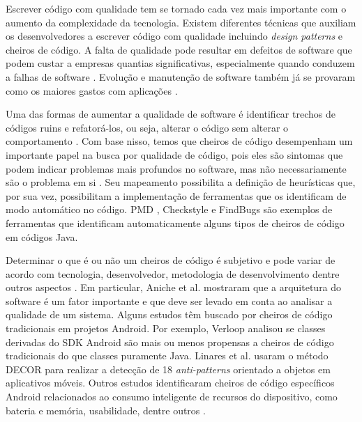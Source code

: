 Escrever código com qualidade tem se tornado cada vez mais importante com o aumento da complexidade da tecnologia. Existem diferentes técnicas que auxiliam os desenvolvedores a escrever código com qualidade incluindo \textit{design patterns} e cheiros de código. A falta de qualidade pode resultar em defeitos de software que podem custar a empresas quantias significativas, especialmente quando conduzem a falhas de software \cite{Nagappan:2005, briand1993modeling}. Evolução e manutenção de software também já se provaram como os maiores gastos com aplicações \cite{RefactoringAndImprovements:10}.

Uma das formas de aumentar a qualidade de software é identificar trechos de códigos ruins e refatorá-los, ou seja, alterar o código sem alterar o comportamento \cite{Refactoring:99}. Com base nisso, temos que cheiros de código desempenham um importante papel na busca por qualidade de código, pois eles são sintomas que podem indicar problemas mais profundos no software, mas não necessariamente são o problema em si \cite{CodeSmell:06}. Seu mapeamento possibilita a definição de heurísticas que, por sua vez, possibilitam a implementação de ferramentas que os identificam de modo automático no código. PMD \cite{PMD2016}, Checkstyle e FindBugs são exemplos de ferramentas que identificam automaticamente alguns tipos de cheiros de código em códigos Java.

Determinar o que é ou não um cheiros de código é subjetivo e pode variar de acordo com tecnologia, desenvolvedor, metodologia de desenvolvimento dentre outros aspectos \cite{WikiCodeSmell}. Em particular, Aniche et al. \cite{MvcSmells:16,aniche2016satt} mostraram que a arquitetura do software é um fator importante e que deve ser levado em conta ao analisar a qualidade de um sistema.   Alguns estudos têm buscado por cheiros de código tradicionais em projetos Android. Por exemplo, Verloop \cite{MobileSmells:13} analisou se classes derivadas do SDK Android são mais ou menos propensas a cheiros de código tradicionais do que classes puramente Java. Linares et al. \cite{DomainMatters} usaram o método DECOR para realizar a detecção de 18 \textit{anti-patterns} orientado a objetos em aplicativos móveis. Outros estudos identificaram cheiros de código específicos Android relacionados ao consumo inteligente de recursos do dispositivo, como bateria e memória, usabilidade, dentre outros \cite{EnergyAndroidSmells, ReimannBrylski2013}. 

